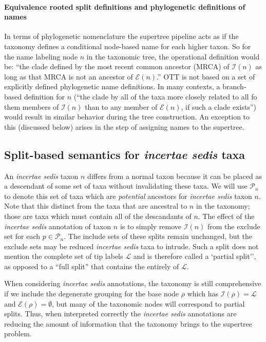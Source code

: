 \documentclass[english]{article}
\begin{document}
\paragraph{Equivalence rooted split definitions and phylogenetic definitions of names}
In terms of phylogenetic nomenclature the supertree pipeline acts as if the
taxonomy defines a conditional node-based name \citep[see][]{deQueiroz2013} for each
higher taxon.
So for the name labeling node $n$ in the taxonomic
tree, the operational definition would be: ``the clade defined by the most recent
common ancestor (MRCA) of $\mathcal{I}(n)$ as long as that MRCA is not an ancestor of
$\mathcal{E}(n)$.''
OTT is not based on a set of explicitly defined phylogenetic name definitions.
In many contexts, a branch-based definition for $n$ (``the clade by all of the taxa more
closely related to all fo them members of $\mathcal{I}(n)$ than to any member of
$\mathcal{E}(n)$, if such a clade exists'') would result in similar behavior
during the tree construction. 
An exception to this (discussed below) arises in the step of assigning names to the 
    supertree.




\subsection{Split-based semantics for \emph{incertae sedis} taxa}

An \emph{incertae sedis} taxon $n$ differs from a normal taxon because it can be
placed as a descendant of some set of taxa without invalidating these taxa.
We will use $\mathcal{P}_n$ to denote this set of taxa which are {\emph{potential}} 
ancestors for \emph{incertae sedis} taxon $n$.
Note that this distinct from the taxa that are ancestral to $n$ in the taxonomy;
    those are taxa which must contain all of the descandants of $n$.
The effect of the \emph{incertae sedis} annotation of taxon $n$ is
    to simply remove $\mathcal{I}(n)$ from the exclude set for each $p\in\mathcal{P}_n$.
The include sets of these splits remain unchanged, but the exclude sets may be reduced
\emph{incertae sedis} taxa to intrude.
Such a split does
not mention the complete set of tip labels $\mathcal{L}$ and is therefore called a
`partial split'', as opposed to a ``full split'' that contains the entirely of $\mathcal{L}$.

When considering \emph{incertae sedis} annotations, the taxonomy is still comprehensive 
if we include the degenerate grouping for the base
    node $\rho$ which has $\mathcal{I}(\rho) = \mathcal{L}$ and $\mathcal{E}(\rho) = \emptyset$,
    but many of the taxonomic nodes will correspond to partial splits.
Thus, when interpreted correctly the \emph{incertae sedis} 
annotations are reducing the amount of information that the taxonomy brings to
the supertree problem.
\end{document}

